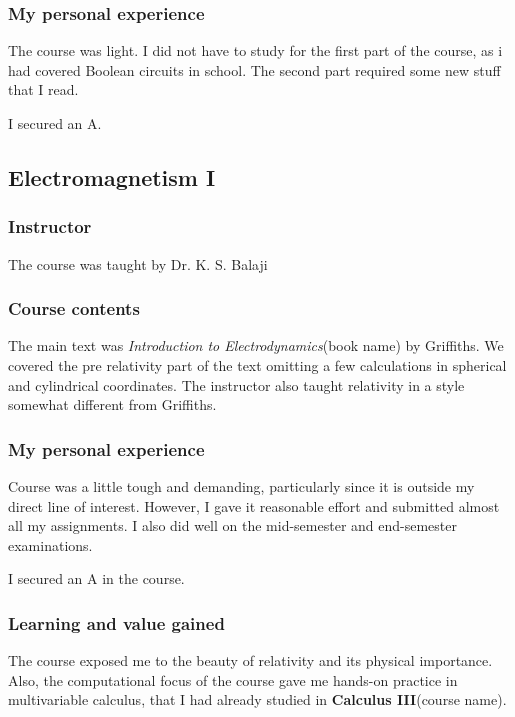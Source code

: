 \documentclass[a4paper]{amsart}
\newcommand{\coursename}[1]{{\bf #1}{\small{(course name)}}}
\newcommand{\bookname}[1]{{\em #1}{\small{(book name)}}}
\begin{document}
\subsubsection{My personal experience}

The course was light. I did not have to study for the first part of the course, as i had covered Boolean circuits in school.
The second part required some new stuff that I read.

I secured an A.

\subsection{Electromagnetism I}

\subsubsection{Instructor}

The course was taught by Dr. K. S. Balaji %


\subsubsection{Course contents}

The main text was \bookname{Introduction to Electrodynamics} by
Griffiths. We covered the pre relativity part of the text omitting a
few calculations in spherical and cylindrical coordinates. The
instructor also taught relativity in a style somewhat different from
Griffiths.

\subsubsection{My personal experience}

Course was a little tough and demanding, particularly since it is
outside my direct line of interest.  However, I gave it reasonable
effort and submitted almost all my assignments. I also did well on
the mid-semester and end-semester examinations.

I secured an A in the course.

\subsubsection{Learning and value gained}

The course exposed me to the beauty of relativity and its physical
importance.  Also, the computational focus of the course gave me
hands-on practice in multivariable calculus, that I had already
studied in \coursename{Calculus III}.
\end{document}
